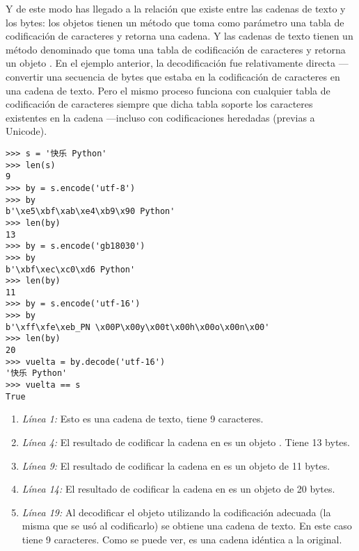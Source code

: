 Y de este modo has llegado a la relación que existe entre las cadenas de texto y los bytes: los objetos  tienen un método  que toma como parámetro una tabla de codificación de caracteres y retorna una cadena. Y las cadenas de texto tienen un método denominado  que toma una tabla de codificación de caracteres y retorna un objeto . En el ejemplo anterior, la decodificación fue relativamente directa ---convertir una secuencia de bytes que estaba en la codificación de caracteres  en una cadena de texto. Pero el mismo proceso funciona con cualquier tabla de codificación de caracteres siempre que dicha tabla soporte los caracteres existentes en la cadena ---incluso con codificaciones heredadas (previas a Unicode).


\noindent\begin{minipage}{\textwidth}
\begin{lstlisting}[mathescape=True,escapeinside=@@]
>>> s = '快乐 Python'
>>> len(s)
9
>>> by = s.encode('utf-8')
>>> by
b'\xe5\xbf\xab\xe4\xb9\x90 Python'
>>> len(by)
13
>>> by = s.encode('gb18030')
>>> by
b'\xbf\xec\xc0\xd6 Python'
>>> len(by)
11
>>> by = s.encode('utf-16')
>>> by
b'\xff\xfe\xeb_PN \x00P\x00y\x00t\x00h\x00o\x00n\x00'
>>> len(by)
20
>>> vuelta = by.decode('utf-16')
'快乐 Python'
>>> vuelta == s
True
\end{lstlisting}
\end{minipage}

\begin{enumerate}

\item \emph{Línea 1:} Esto es una cadena de texto, tiene 9 caracteres.

\item \emph{Línea 4:} El resultado de codificar la cadena en  es un objeto . Tiene 13 bytes. 

\item \emph{Línea 9:} El resultado de codificar la cadena en  es un objeto  de 11 bytes.

\item \emph{Línea 14:} El resultado de codificar la cadena en  es un objeto  de 20 bytes.

\item \emph{Línea 19:} Al decodificar el objeto  utilizando la codificación adecuada (la misma que se usó al codificarlo) se obtiene una cadena de texto. En este caso tiene 9 caracteres. Como se puede ver, es una cadena idéntica a la original.

\end{enumerate}

